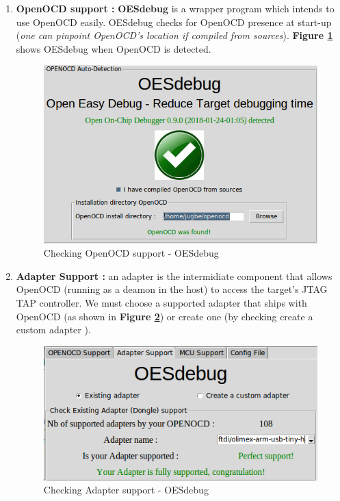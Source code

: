\begin{enumerate}
\begin{enumerate}
	
		\item \textbf{OpenOCD support :} \textbf{OESdebug} is a wrapper program which intends to use OpenOCD easily. OESdebug checks for OpenOCD presence at start-up (\textit{one can pinpoint OpenOCD's location if compiled from sources}). \textbf{Figure \ref{Checking OpenOCD support - OESdebug}} shows OESdebug when OpenOCD is detected.		
		\begin{figure}[H]
			\centering
        	\includegraphics[scale=0.32]{img/solution/OESdebug-detect-OpenOCD.png}
        	\caption{Checking OpenOCD support - OESdebug}
        	\label{Checking OpenOCD support - OESdebug}
    	\end{figure}
		
			
		\item \textbf{Adapter Support : } an adapter is the intermidiate component that allows OpenOCD (running as a deamon in the host) to access the target's JTAG TAP controller. We must choose a supported adapter that ships with OpenOCD (as shown in \textbf{Figure \ref{Checking Adapter support - OESdebug}}) or create one (by checking \og create a custom adapter \fg).
		\begin{figure}[H]
			\centering
        	\includegraphics[scale=0.32]{img/solution/OESdebug-adapterSupport.png}
        	\caption{Checking Adapter support - OESdebug}
        	\label{Checking Adapter support - OESdebug}
    	\end{figure}
    			

\end{enumerate}
\end{enumerate}
